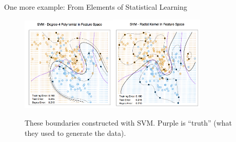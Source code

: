 \documentclass[mathserif, aspectratio=169]{beamer}
\begin{document}
\begin{frame}{One more example: From Elements of Statistical Learning}

\begin{figure}
\includegraphics[width=0.4075\textwidth]{ESL_12_3a}\includegraphics[width=0.4\textwidth]{ESL_12_3b}
\caption*{These boundaries constructed with SVM. Purple is ``truth'' (what they used to generate the data).  }
\end{figure}

\end{frame}
\end{document}
